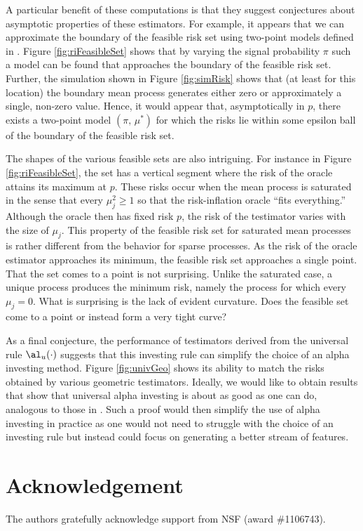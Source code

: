 \documentclass[12pt]{article}
\begin{document}
 A particular benefit of these computations is that they suggest conjectures
 about asymptotic properties of these estimators.  For example, it appears that
 we can approximate the boundary of the feasible risk set using two-point models
 defined in .  Figure \ref{fig:riFeasibleSet} shows that by varying
 the signal probability $\pi$ such a model can be found that approaches the
 boundary of the feasible risk set.  Further, the simulation shown in Figure
 \ref{fig:simRisk} shows that (at least for this location) the boundary mean
 process generates either zero or approximately a single, non-zero value.
  Hence, it would appear that, asymptotically in $p$, there exists a two-point
 model $(\pi,\,\mu^{*})$ for which the risks lie within some epsilon ball of the
 boundary of the feasible risk set.


 The shapes of the various feasible sets are also intriguing.  For instance in
 Figure \ref{fig:riFeasibleSet}, the set has a vertical segment where the risk
 of the oracle attains its maximum at $p$.  These risks occur when the mean
 process is saturated in the sense that every $\mu_j^2 \ge 1$ so that the
 risk-inflation oracle ``fits everything.''  Although the oracle then has fixed
 risk $p$, the risk of the testimator varies with the size of $\mu_j$.  This
 property of the feasible risk set for saturated mean processes is rather
 different from the behavior for sparse processes.  As the risk of the oracle
 estimator approaches its minimum, the feasible risk set approaches a single
 point.  That the set comes to a point is not surprising.  Unlike the saturated
 case, a unique process produces the minimum risk, namely the process for which
 every $\mu_j = 0$.  What is surprising is the lack of evident curvature.  Does
 the feasible set come to a point or instead form a very tight curve?
 

 As a final conjecture, the performance of testimators derived from the
 universal rule $\al_u(\cdot)$ suggests that this investing rule can simplify
 the choice of an alpha investing method.  Figure \ref{fig:univGeo} shows its
 ability to match the risks obtained by various geometric testimators.  Ideally,
 we would like to obtain results that show that universal alpha investing is about
 as good as one can do, analogous to those in \citet{rissanen83}.  Such a proof would
 then simplify the use of alpha investing in practice as one would not need to
 struggle with the choice of an investing rule but instead could focus on
 generating a better stream of features.


\section*{Acknowledgement}

The authors gratefully acknowledge support from NSF (award \#1106743).





\end{document}

